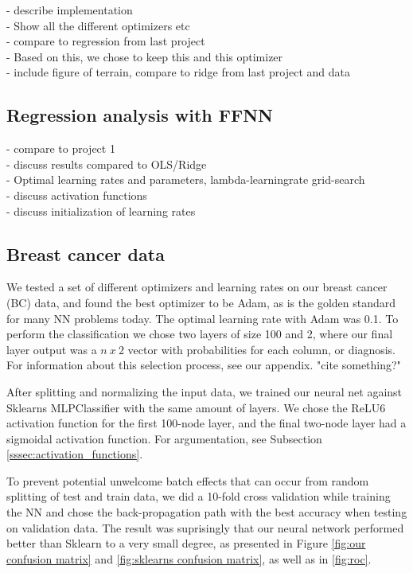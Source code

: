 - describe implementation\\
- Show all the different optimizers etc\\
- compare to regression from last project\\
- Based on this, we chose to keep this and this optimizer\\
- include figure of terrain, compare to ridge from last project and data\\



\subsection{Regression analysis with FFNN}

- compare to project 1\\
- discuss results compared to OLS/Ridge\\
- Optimal learning rates and parameters, lambda-learningrate grid-search\\
- discuss activation functions\\
- discuss initialization of learning rates\\


\subsection{Breast cancer data}
We tested a set of different optimizers and learning rates on our breast cancer (BC) data, and found the best optimizer to be Adam, as is the golden standard for many NN problems today. The optimal learning rate with Adam was 0.1. To perform the classification we chose two layers of size 100 and 2, where our final layer output was a $n\ x\ 2$ vector with probabilities for each column, or diagnosis. For information about this selection process, see our appendix. "cite something?"

After splitting and normalizing the input data, we trained our neural net against Sklearns MLPClassifier with the same amount of layers. We chose the ReLU6 activation function for the first 100-node layer, and the final two-node layer had a sigmoidal activation function. For argumentation, see Subsection \ref{sssec:activation_functions}.

To prevent potential unwelcome batch effects that can occur from random splitting of test and train data, we did a 10-fold cross validation while training the NN and chose the back-propagation path with the best accuracy when testing on validation data. The result was suprisingly that our neural network performed better than Sklearn to a very small degree, as presented in Figure \ref{fig:our confusion matrix} and \ref{fig:sklearns confusion matrix}, as well as in \ref{fig:roc}.

